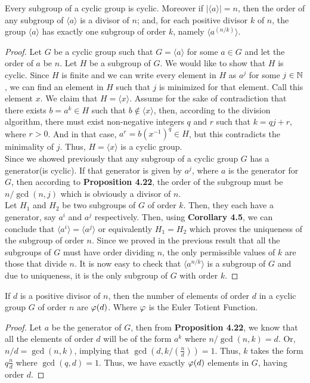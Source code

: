 \begin{theorem}
	Every subgroup of a cyclic group is cyclic. Moreover if $|\langle a\rangle|=n$, then the order of any subgroup of $\langle a\rangle$ is a divisor of $n$; and, for each positive divisor $k$ of $n$, the group $\langle a\rangle$ has exactly one subgroup of order $k$, namely $\langle a^{(n/k)}\rangle$. 
\end{theorem}
\begin{proof} %
	Let $G$ be a cyclic group such that $G=\langle a\rangle$ for some $a\in G$ and let the order of $a$ be $n$. Let $H$ be a subgroup of $G$. We would like to show that $H$ is cyclic. Since $H$ is finite and we can write every element in $H$ as $a^j$ for some $j\in\mathbb{N}$, we can find an element in $H$ such that $j$ is minimized for that element. Call this element $x$. We claim that $H=\langle x\rangle$. Assume for the sake of contradiction that there exists $b=a^k\in H$ such that $b\notin\langle x\rangle$, then, according to the division algorithm, there must exist non-negative integers $q$ and $r$ such that $k=qj+r$, where $r>0$. And in that case, $a^r=b(x^{-1})^{q}\in H$, but this contradicts the minimality of $j$. Thus, $H=\langle x\rangle$ is a cyclic group.\\
	Since we showed previously that any subgroup of a cyclic group $G$ has a generator(is cyclic). If that generator is given by $a^j$, where $a$ is the generator for $G$, then according to \textbf{Proposition 4.22}, the order of the subgroup must be $n/\gcd(n,j)$ which is obviously a divisor of $n$.\\
	Let $H_1$ and $H_2$ be two subgroups of $G$ of order $k$. Then, they each have a generator, say $a^i$ and $a^j$ respectively. Then, using \textbf{Corollary 4.5}, we can conclude that $\langle a^i\rangle=\langle a^j\rangle$ or equivalently $H_1=H_2$ which proves the uniqueness of the subgroup of order $n$. Since we proved in the previous result that all the subgroups of $G$ must have order dividing $n$, the only permissible values of $k$ are those that divide $n$. It is now easy to check that $\langle a^{n/k}\rangle$ is a subgroup of $G$ and due to uniqueness, it is the only subgroup of $G$ with order $k$. 
\end{proof}

\begin{proposition}
	If $d$ is a positive divisor of $n$, then the number of elements of order $d$ in a cyclic group $G$ of order $n$ are $\varphi(d)$. Where $\varphi$ is the Euler Totient Function.
\end{proposition}
\begin{proof}
	Let $a$ be the generator of $G$, then from \textbf{Proposition 4.22}, we know that all the elements of order $d$ will be of the form $a^k$ where $n/\gcd(n,k)=d$. Or, $n/d = \gcd(n,k)$, implying that $\gcd(d,k/(\frac{n}{d}))=1$. Thus, $k$ takes the form $q\frac{n}{d}$ where $\gcd(q,d)=1$. Thus, we have exactly $\varphi(d)$ elements in $G$, having order $d$.
\end{proof}

